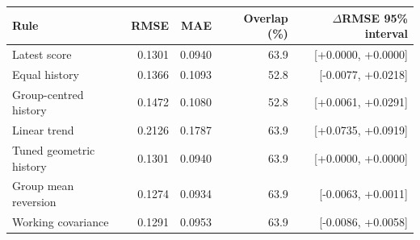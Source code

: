 \begin{tabular}{lrrrr}
\toprule
Rule & RMSE & MAE & Overlap (\%) & $\Delta$RMSE 95\% interval \\
\midrule
Latest score & 0.1301 & 0.0940 & 63.9 & [+0.0000, +0.0000] \\
Equal history & 0.1366 & 0.1093 & 52.8 & [-0.0077, +0.0218] \\
Group-centred history & 0.1472 & 0.1080 & 52.8 & [+0.0061, +0.0291] \\
Linear trend & 0.2126 & 0.1787 & 63.9 & [+0.0735, +0.0919] \\
Tuned geometric history & 0.1301 & 0.0940 & 63.9 & [+0.0000, +0.0000] \\
Group mean reversion & 0.1274 & 0.0934 & 63.9 & [-0.0063, +0.0011] \\
Working covariance & 0.1291 & 0.0953 & 63.9 & [-0.0086, +0.0058] \\
\bottomrule
\end{tabular}
